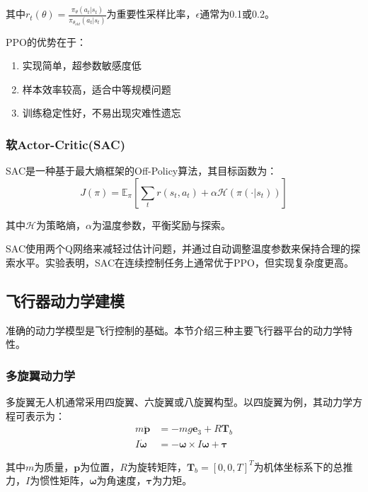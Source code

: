 \documentclass[12pt,a4paper]{ctexart}
\begin{document}
其中$r_t(\theta) = \frac{\pi_\theta(a_t|s_t)}{\pi_{\theta_{old}}(a_t|s_t)}$为重要性采样比率，$\epsilon$通常为0.1或0.2。

PPO的优势在于：
\begin{enumerate}
    \item 实现简单，超参数敏感度低
    \item 样本效率较高，适合中等规模问题
    \item 训练稳定性好，不易出现灾难性遗忘
\end{enumerate}

\subsubsection{软Actor-Critic(SAC)}

SAC是一种基于最大熵框架的Off-Policy算法，其目标函数为：
\begin{equation}
    J(\pi) = \mathbb{E}_{\pi}\left[\sum_t r(s_t, a_t) + \alpha \mathcal{H}(\pi(\cdot|s_t))\right]
\end{equation}

其中$\mathcal{H}$为策略熵，$\alpha$为温度参数，平衡奖励与探索。

SAC使用两个Q网络来减轻过估计问题，并通过自动调整温度参数来保持合理的探索水平。实验表明，SAC在连续控制任务上通常优于PPO，但实现复杂度更高。

\subsection{飞行器动力学建模}

准确的动力学模型是飞行控制的基础。本节介绍三种主要飞行器平台的动力学特性。

\subsubsection{多旋翼动力学}

多旋翼无人机通常采用四旋翼、六旋翼或八旋翼构型。以四旋翼为例，其动力学方程可表示为：
\begin{align}
    m\ddot{\mathbf{p}} &= -mg\mathbf{e}_3 + R\mathbf{T}_b \\
    I\dot{\boldsymbol{\omega}} &= -\boldsymbol{\omega} \times I\boldsymbol{\omega} + \boldsymbol{\tau}
\end{align}

其中$m$为质量，$\mathbf{p}$为位置，$R$为旋转矩阵，$\mathbf{T}_b = [0, 0, T]^T$为机体坐标系下的总推力，$I$为惯性矩阵，$\boldsymbol{\omega}$为角速度，$\boldsymbol{\tau}$为力矩。
\end{document}
